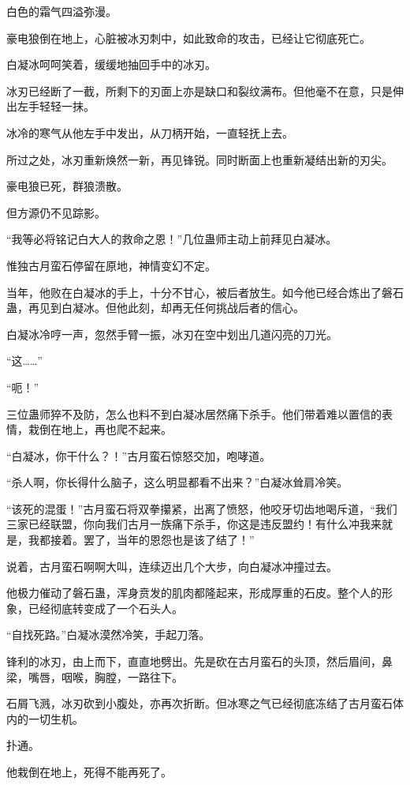 \begin{this_body}
白色的霜气四溢弥漫。

豪电狼倒在地上，心脏被冰刃刺中，如此致命的攻击，已经让它彻底死亡。

白凝冰呵呵笑着，缓缓地抽回手中的冰刃。

冰刃已经断了一截，所剩下的刃面上亦是缺口和裂纹满布。但他毫不在意，只是伸出左手轻轻一抹。

冰冷的寒气从他左手中发出，从刀柄开始，一直轻抚上去。

所过之处，冰刃重新焕然一新，再见锋锐。同时断面上也重新凝结出新的刃尖。

豪电狼已死，群狼溃散。

但方源仍不见踪影。

“我等必将铭记白大人的救命之恩！”几位蛊师主动上前拜见白凝冰。

惟独古月蛮石停留在原地，神情变幻不定。

当年，他败在白凝冰的手上，十分不甘心，被后者放生。如今他已经合炼出了磐石蛊，再见到白凝冰。但他此刻，却再无任何挑战后者的信心。

白凝冰冷哼一声，忽然手臂一振，冰刃在空中划出几道闪亮的刀光。

“这……”

“呃！”

三位蛊师猝不及防，怎么也料不到白凝冰居然痛下杀手。他们带着难以置信的表情，栽倒在地上，再也爬不起来。

“白凝冰，你干什么？！”古月蛮石惊怒交加，咆哮道。

“杀人啊，你长得什么脑子，这么明显都看不出来？”白凝冰耸肩冷笑。

“该死的混蛋！”古月蛮石将双拳攥紧，出离了愤怒，他咬牙切齿地喝斥道，“我们三家已经联盟，你向我们古月一族痛下杀手，你这是违反盟约！有什么冲我来就是，我都接着。罢了，当年的恩怨也是该了结了！”

说着，古月蛮石啊啊大叫，连续迈出几个大步，向白凝冰冲撞过去。

他极力催动了磐石蛊，浑身贲发的肌肉都隆起来，形成厚重的石皮。整个人的形象，已经彻底转变成了一个石头人。

“自找死路。”白凝冰漠然冷笑，手起刀落。

锋利的冰刃，由上而下，直直地劈出。先是砍在古月蛮石的头顶，然后眉间，鼻梁，嘴唇，咽喉，胸膛，一路往下。

石屑飞溅，冰刃砍到小腹处，亦再次折断。但冰寒之气已经彻底冻结了古月蛮石体内的一切生机。

扑通。

他栽倒在地上，死得不能再死了。


\end{this_body}
